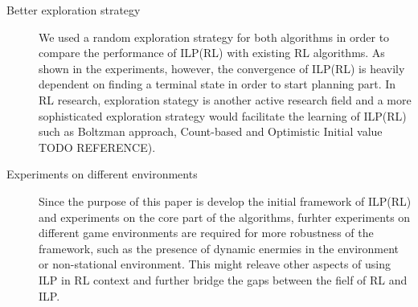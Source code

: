 \begin{description}
    \item[Better exploration strategy]
    We used a random exploration strategy for both algorithms in order to compare the performance of ILP(RL) with existing RL algorithms. 
    As shown in the experiments, however, the convergence of ILP(RL) is heavily dependent on finding a terminal state in order to start planning part.
    In RL research, exploration stategy is another active research field and a more sophisticated exploration strategy would facilitate the learning of ILP(RL)
    such as Boltzman approach, Count-based and Optimistic Initial value TODO REFERENCE).
    \item[Experiments on different environments]
    Since the purpose of this paper is develop the initial framework of ILP(RL) and experiments on the core part of the algorithms,
    furhter experiments on different game environments are required for more robustness of the framework, such as the presence of dynamic enermies in the environment or non-stational environment.
    This might releave other aspects of using ILP in RL context and further bridge the gaps between the fielf of RL and ILP.



\end{description}
